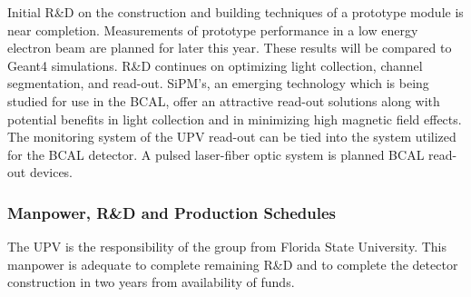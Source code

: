 Initial R\&D on the construction and building techniques of a prototype module is near completion. Measurements of prototype performance in a low energy electron beam are planned for later this year.  These results will be compared to Geant4 simulations.   R\&D continues on optimizing light collection, channel segmentation, and read-out. SiPM's, an emerging technology which is being studied for use in the BCAL, offer an attractive read-out solutions along with potential benefits in light collection and in minimizing high magnetic field effects. The monitoring system of the UPV read-out can be tied into the system utilized for the BCAL detector. A pulsed laser-fiber optic system is planned BCAL read-out devices.



\subsubsection*{Manpower, R\&D and Production Schedules}

The UPV is the responsibility of the group from Florida State University.  
This manpower is adequate to complete remaining R\&D and to complete the 
detector construction in two years from availability of funds.

